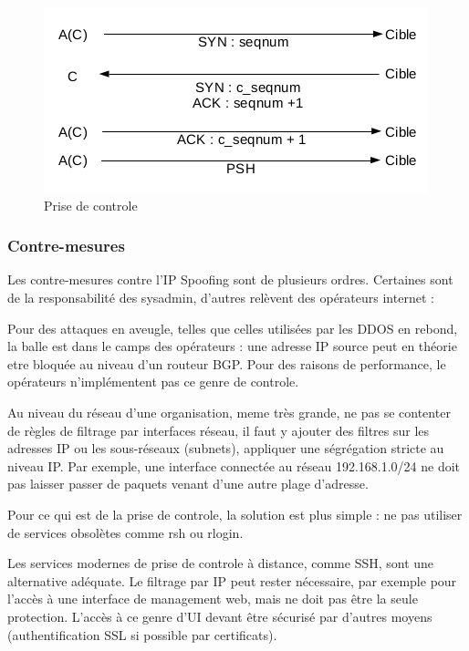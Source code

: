 \begin{figure}[hbtp]
\caption{Prise de controle}
\centering
\includegraphics[scale=1]{../images/ip-spoofing-control.png}
\end{figure}

\subsubsection{Contre-mesures}\label{vulnerabilites:reseau:spoofing:ip:countermeasures}

Les contre-mesures contre l'IP Spoofing sont de plusieurs ordres. Certaines sont de la responsabilité des sysadmin, d'autres relèvent des opérateurs internet :


Pour des attaques en aveugle, telles que celles utilisées par les DDOS en rebond, la balle est dans le camps des opérateurs : une adresse IP source peut en théorie etre bloquée au niveau d'un routeur BGP. Pour des raisons de performance, le opérateurs n'implémentent pas ce genre de controle.


Au niveau du réseau d'une organisation, meme très grande, ne pas se contenter de règles de filtrage par interfaces réseau, il faut y ajouter des filtres sur les adresses IP ou les sous-réseaux (subnets), appliquer une ségrégation stricte au niveau IP. Par exemple, une interface connectée au réseau 192.168.1.0/24 ne doit pas laisser passer de paquets venant d'une autre plage d'adresse.


Pour ce qui est de la prise de controle, la solution est plus simple : ne pas utiliser de services obsolètes comme rsh ou rlogin.

Les services modernes de prise de controle à distance, comme SSH, sont une alternative adéquate. Le filtrage par IP peut rester nécessaire, par exemple pour l'accès à une interface de management web, mais ne doit pas être la seule protection. L'accès à ce genre d'UI devant être sécurisé par d'autres moyens (authentification SSL si possible par certificats).

